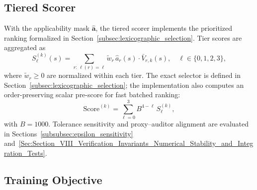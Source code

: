 \subsection{Tiered Scorer}
\label{subsec:tiered_scorer}

With the applicability mask $\hat{\mathbf{a}}$, the tiered scorer implements the prioritized ranking formalized in Section~\ref{subsec:lexicographic_selection}. Tier scores are aggregated as
\begin{equation}
\label{eq:tier_score_full}
S_\ell^{(k)}(s)=\sum_{r:\,\ell(r)=\ell}\tilde{w}_r\,\hat{a}_r(s)\cdot \bar{V}_{r,k}(s), \quad \ell\in\{0,1,2,3\},
\end{equation}
where $\tilde{w}_r \geq 0$ are normalized within each tier. The exact selector is defined in Section~\ref{subsec:lexicographic_selection}; the implementation also computes an order-preserving scalar pre-score for fast batched ranking:
\begin{equation}
\text{Score}^{(k)}=\sum_{\ell=0}^{3} B^{4-\ell}\,S_\ell^{(k)},
\end{equation}
with $B{=}1000$. Tolerance sensitivity and proxy--auditor alignment are evaluated in Sections~\ref{subsubsec:epsilon_sensitivity} and~\ref{Sec:Section_VIII_Verification_Invariants_Numerical_Stability_and_Integration_Tests}.

\subsection{Training Objective}
\label{subsec:training_objective}

